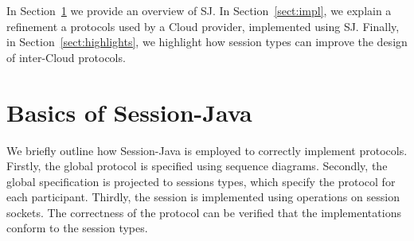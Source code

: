 \documentclass[10pt]{llncs}
\begin{document}


In Section~\ref{sect:basics} we provide an overview of SJ.
In Section~\ref{sect:impl}, we explain a refinement a protocols used by a Cloud provider, implemented using SJ. %
Finally, in Section~\ref{sect:highlights}, we highlight how session types can improve the design of inter-Cloud protocols.


\section{Basics of Session-Java}
\label{sect:basics}

We briefly outline how Session-Java is employed to correctly implement protocols.
Firstly, the global protocol is specified using sequence diagrams. Secondly, the global specification is projected to sessions types, which specify the protocol for each participant.
Thirdly, the session is implemented using operations on session sockets. The correctness of the protocol can be verified that the implementations conform to the session types.

\end{document}
